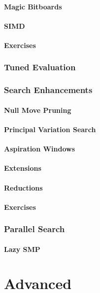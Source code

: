 \documentclass{article}
\begin{document}
\subsection{Magic Bitboards}
\subsection{SIMD}
\subsection{Exercises}
\section{Tuned Evaluation}
\section{Search Enhancements}
\subsection{Null Move Pruning}
\subsection{Principal Variation Search}
\subsection{Aspiration Windows}
\subsection{Extensions}
\subsection{Reductions}
\subsection{Exercises}

\section{Parallel Search}
\subsection{Lazy SMP}

\newpage
\part{Advanced}
\end{document}
